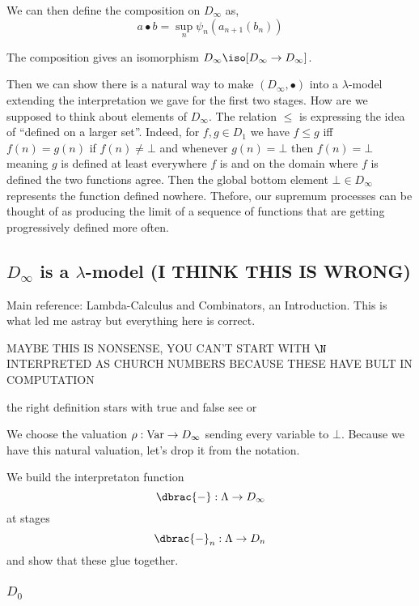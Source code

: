 \documentclass[12pt]{article}
\begin{document}
We can then define the composition on $D_{\infty}$ as,
\[ a \bullet b = \sup_n \psi_n(a_{n+1}(b_n)) \]

\begin{prop}
The composition gives an isomorphism $D_{\infty} \iso [D_{\infty} \to D_{\infty}]$. 
\end{prop}

Then we can show there is a natural way to make $(D_\infty, \bullet)$ into a $\lambda$-model extending the interpretation we gave for the first two stages. How are we supposed to think about elements of $D_\infty$. The relation $\le$ is expressing the idea of ``defined on a larger set''. Indeed, for $f,g \in D_1$ we have $f \le g$ iff $f(n) = g(n)$ if $f(n) \neq \bot$ and whenever $g(n) = \bot$ then $f(n) = \bot$ meaning $g$ is defined at least everywhere $f$ is and on the domain where $f$ is defined the two functions agree. Then the global bottom element $\bot \in D_\infty$ represents the function defined nowhere. Thefore, our supremum processes can be thought of as producing the limit of a sequence of functions that are getting progressively defined more often. 

\subsection{$D_\infty$ is a $\lambda$-model (I THINK THIS IS WRONG)}

Main reference: Lambda-Calculus and Combinators, an Introduction. This is what led me astray but everything here is correct. 


{\color{red} MAYBE THIS IS NONSENSE, YOU CAN'T START WITH $\N$ INTERPRETED AS CHURCH NUMBERS BECAUSE THESE HAVE BULT IN COMPUTATION}

{\color{red} the right definition stars with true and false see  or } 

We choose the valuation $\rho : \mathrm{Var} \to D_\infty$ sending every variable to $\bot$. Because we have this natural valuation, let's drop it from the notation.

We build the interpretaton function
\[ \dbrac{-} : \Lambda \to D_\infty \]
at stages
\[ \dbrac{-}_n : \Lambda \to D_n \]
and show that these glue together.

\subsubsection{$D_0$}
\end{document}
